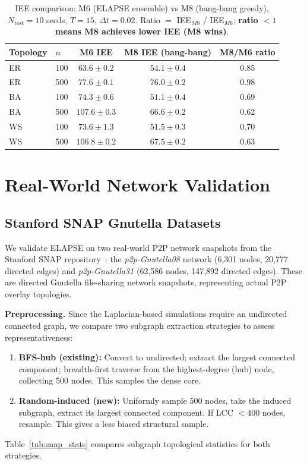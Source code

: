 \documentclass[review,12pt]{elsarticle}
\begin{document}
\begin{table}[htbp]
  \caption{IEE comparison: M6 (ELAPSE ensemble) vs M8 (bang-bang greedy),
           $N_{\mathrm{test}}=10$ seeds, $T=15$, $\Delta t=0.02$.
           Ratio $=$ IEE$_{M8}$ / IEE$_{M6}$;
           \textbf{ratio $<1$ means M8 achieves lower IEE (M8 wins)}.}
  \label{tab:greedy}
  \centering
  \small
  \renewcommand{\arraystretch}{1.2}
  \begin{tabular}{llccc}
    \toprule
    Topology & $n$ & M6 IEE & M8 IEE (bang-bang) & M8/M6 ratio \\
    \midrule
    ER & 100 & $63.6\pm 0.2$ & $54.1\pm 0.4$ & 0.85 \\
    ER & 500 & $77.6\pm 0.1$ & $76.0\pm 0.2$ & 0.98 \\
    BA & 100 & $74.3\pm 0.6$ & $51.1\pm 0.4$ & 0.69 \\
    BA & 500 & $107.6\pm 0.3$ & $66.6\pm 0.2$ & 0.62 \\
    WS & 100 & $73.6\pm 1.3$ & $51.5\pm 0.3$ & 0.70 \\
    WS & 500 & $106.8\pm 0.2$ & $67.5\pm 0.2$ & 0.63 \\
    \bottomrule
  \end{tabular}
\end{table}

\section{Real-World Network Validation}
\label{sec:snap}

\subsection{Stanford SNAP Gnutella Datasets}

We validate ELAPSE on two real-world P2P network snapshots from the
Stanford SNAP repository~\cite{snapnets,leskovec2007graph}: the
\emph{p2p-Gnutella08} network (6,301 nodes, 20,777 directed edges) and
\emph{p2p-Gnutella31} (62,586 nodes, 147,892 directed edges). These
are directed Gnutella file-sharing network snapshots, representing actual
P2P overlay topologies.

\textbf{Preprocessing.} Since the Laplacian-based simulations require an
undirected connected graph, we compare two subgraph extraction strategies
to assess representativeness:
\begin{enumerate}
  \item \textbf{BFS-hub (existing):} Convert to undirected; extract the largest
        connected component; breadth-first traverse from the highest-degree
        (hub) node, collecting 500 nodes. This samples the dense core.
  \item \textbf{Random-induced (new):} Uniformly sample 500 nodes, take the
        induced subgraph, extract its largest connected component. If LCC
        $< 400$ nodes, resample. This gives a less biased structural sample.
\end{enumerate}
Table~\ref{tab:snap_stats} compares subgraph topological statistics for
both strategies.
\end{document}
